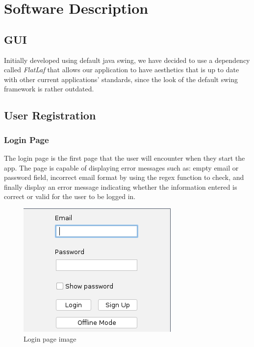 \chapter{\centering Software Description}

\section{GUI}

Initially developed using default java swing, we have decided to use a dependency called \emph{FlatLaf} that allows our application to have aesthetics that is up to date with other current applications' standards, since the look of the default swing framework is rather outdated.

\section{User Registration}

\subsection{Login Page}
The login page is the first page that the user will encounter when they start the app. The page is 
capable of displaying error messages such as: empty email or password field, incorrect email format by using the regex
function to check, and finally display an error message indicating whether the information entered is correct or valid for the user to be
logged in.

\begin{figure}[ht]
	\centering
	\includegraphics[scale=0.5,keepaspectratio]{Figures/login_page.png}
    \caption{Login page image}
    \label{fig:loginPage}
\end{figure}

